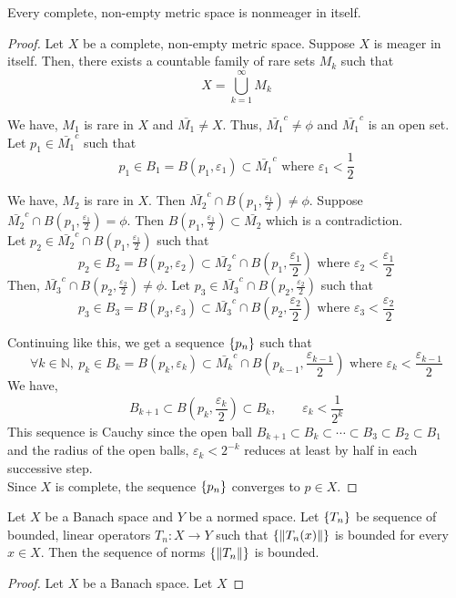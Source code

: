 \begin{theorem}
	Every complete, non-empty metric space is nonmeager in itself.
\end{theorem}
\begin{proof}
	Let $X$ be a complete, non-empty metric space.
	Suppose $X$ is meager in itself.
	Then, there exists a countable family of rare sets $M_k$ such that 
	\[ X = \bigcup_{k=1}^\infty M_k \]

	We have, $M_1$ is rare in $X$ and $\bar{M_1} \ne X$.
	Thus, $\bar{M_1}^c \ne \phi$ and $\bar{M_1}^c$ is an open set.
	Let $p_1 \in \bar{M_1}^c$ such that 
	\[ p_1 \in B_1 = B(p_1,\varepsilon_1) \subset \bar{M_1}^c \text{ where }\varepsilon_1 < \frac{1}{2} \]

	We have, $M_2$ is rare in $X$.
	Then $\bar{M_2}^c \cap B(p_1,\frac{\varepsilon_1}{2}) \ne \phi$.
	Suppose $\bar{M_2}^c \cap B(p_1,\frac{\varepsilon_1}{2}) = \phi$.
	Then $B(p_1,\frac{\varepsilon_1}{2}) \subset \bar{M_2}$ which is a contradiction.\\

	Let $p_2 \in \bar{M_2}^c \cap B(p_1,\frac{\varepsilon_1}{2})$ such that 
	\[p_2 \in B_2 = B(p_2,\varepsilon_2) \subset \bar{M_2}^c \cap B(p_1,\frac{\varepsilon_1}{2}) \text{ where }\varepsilon_2 < \frac{\varepsilon_1}{2} \]
	Then, $\bar{M_3}^c \cap B(p_2,\frac{\varepsilon_2}{2}) \ne \phi$.
	Let $p_3 \in \bar{M_3}^c \cap B(p_2,\frac{\varepsilon_2}{2})$ such that 
	\[ p_3 \in B_3 = B(p_3,\varepsilon_3) \subset \bar{M_3}^c \cap B(p_2,\frac{\varepsilon_2}{2}) \text{ where }\varepsilon_3 <\frac{\varepsilon_2}{2} \]

	Continuing like this, we get a sequence $\left\{p_n\right\}$ such that 
	\[\forall k \in \mathbb{N},\ p_k \in B_k = B(p_k,\varepsilon_k) \subset \bar{M_k}^c \cap B(p_{k-1},\frac{\varepsilon_{k-1}}{2}) \text{ where }\varepsilon_k < \frac{\varepsilon_{k-1}}{2} \]
	We have, \[B_{k+1} \subset B(p_k,\frac{\varepsilon_k}{2}) \subset B_k,\qquad \varepsilon_k < \frac{1}{2^k} \]
	This sequence is Cauchy since the open ball $B_{k+1} \subset B_k \subset \dotsb \subset B_3 \subset B_2 \subset B_1$ and the radius of the open balls, $\varepsilon_k < 2^{-k}$ reduces at least by half in each successive step.\\

	Since $X$ is complete, the sequence $\left\{p_n\right\}$ converges to $p \in X$.
\end{proof}

\begin{theorem}
	Let $X$ be a Banach space and $Y$ be a normed space.
	Let $\left\{T_n\right\}$ be sequence of bounded, linear operators $T_n : X \to Y$ such that $\left\{\|T_n(x)\|\right\}$ is bounded for every $x \in X$.
	Then the sequence of norms $\left\{\|T_n\|\right\}$ is bounded.
\end{theorem}
\begin{proof}
	Let $X$ be a Banach space.
	Let $X$
\end{proof}

